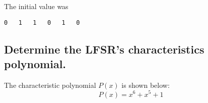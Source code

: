 \documentclass{article}
\begin{document}
The initial value was 
\begin{verbatim}
0	1	1	0	1	0
\end{verbatim}

\subsection*{Determine the LFSR's characteristics polynomial.}
The characteristic polynomial $P(x)$ is shown below:
\begin{equation}
P(x) = x^6 + x^5 + 1
\end{equation}
\end{document}

